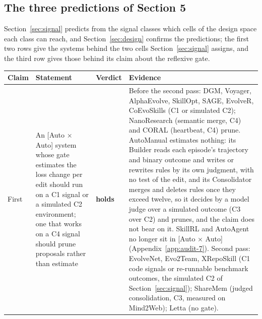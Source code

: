 \documentclass[
  11pt,
]{article}
\newcounter{none} %
\begin{document}
\subsection{The three predictions of Section 5}\label{app:audit-5}

Section~\ref{sec:signal} predicts from the signal classes which cells of the design space each class can reach, and Section~\ref{sec:design} confirms the predictions; the first two rows give the systems behind the two cells Section~\ref{sec:signal} assigns, and the third row gives those behind its claim about the reflexive gate.

{\def\LTcaptype{none} %
\begin{longtable}[]{@{}
  >{\raggedright\arraybackslash}p{}
  >{\raggedright\arraybackslash}p{}
  >{\raggedright\arraybackslash}p{}
  >{\raggedright\arraybackslash}p{}@{}}
\toprule\noalign{}
\begin{minipage}[b]{\linewidth}\raggedright
Claim
\end{minipage} & \begin{minipage}[b]{\linewidth}\raggedright
Statement
\end{minipage} & \begin{minipage}[b]{\linewidth}\raggedright
Verdict
\end{minipage} & \begin{minipage}[b]{\linewidth}\raggedright
Evidence
\end{minipage} \\
\midrule\noalign{}
\endhead
\bottomrule\noalign{}
\endlastfoot
First & An {[}Auto × Auto{]} system whose gate estimates the loss change per edit should run on a C1 signal or a simulated C2 environment; one that works on a C4 signal should prune proposals rather than estimate & \textbf{holds} & Before the second pass: DGM, Voyager, AlphaEvolve, SkillOpt, SAGE, EvolveR, CoEvoSkills (C1 or simulated C2); NanoResearch (semantic merge, C4) and CORAL (heartbeat, C4) prune. AutoManual estimates nothing: its Builder reads each episode's trajectory and binary outcome and writes or rewrites rules by its own judgment, with no test of the edit, and its Consolidator merges and deletes rules once they exceed twelve, so it decides by a model judge over a simulated outcome (C3 over C2) and prunes, and the claim does not bear on it. SkillRL and AutoAgent no longer sit in {[}Auto × Auto{]} (Appendix~\ref{app:audit-7}). Second pass: EvolveNet, Evo2Team, XRepoSkill (C1 code signals or re-runnable benchmark outcomes, the simulated C2 of Section~\ref{sec:signal}); ShareMem (judged consolidation, C3, measured on Mind2Web); Letta (no gate). \\

\end{longtable}}
\end{document}
